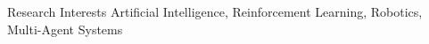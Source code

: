 \begin{rSection}{Research Interests}
Artificial Intelligence, Reinforcement Learning, Robotics, Multi-Agent Systems
\end{rSection}